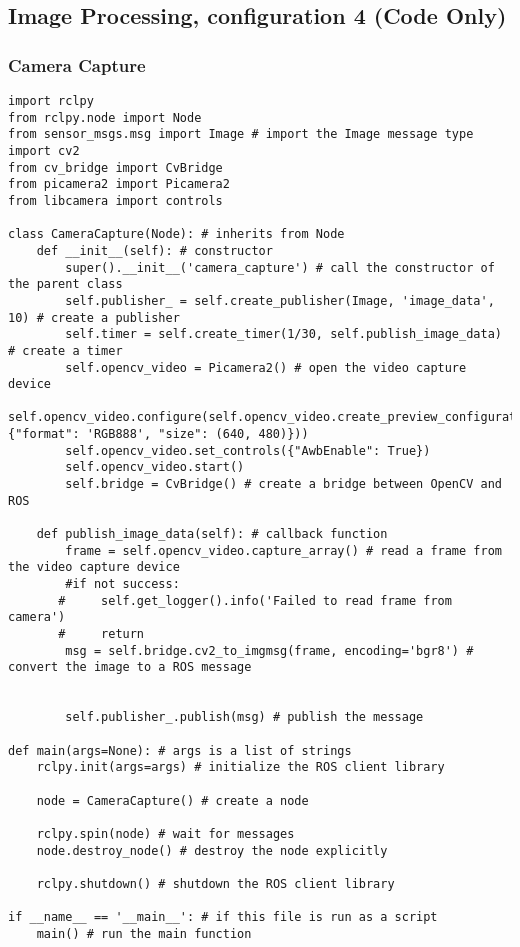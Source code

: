 \subsection{Image Processing, configuration 4 (Code Only)}

\subsubsection{Camera Capture}
\begin{lstlisting}[language=PythonPlus, basicstyle=\tiny,]
import rclpy
from rclpy.node import Node
from sensor_msgs.msg import Image # import the Image message type
import cv2
from cv_bridge import CvBridge
from picamera2 import Picamera2
from libcamera import controls

class CameraCapture(Node): # inherits from Node
    def __init__(self): # constructor
        super().__init__('camera_capture') # call the constructor of the parent class
        self.publisher_ = self.create_publisher(Image, 'image_data', 10) # create a publisher
        self.timer = self.create_timer(1/30, self.publish_image_data) # create a timer
        self.opencv_video = Picamera2() # open the video capture device
        self.opencv_video.configure(self.opencv_video.create_preview_configuration(main={"format": 'RGB888', "size": (640, 480)}))
        self.opencv_video.set_controls({"AwbEnable": True})
        self.opencv_video.start() 
        self.bridge = CvBridge() # create a bridge between OpenCV and ROS

    def publish_image_data(self): # callback function
        frame = self.opencv_video.capture_array() # read a frame from the video capture device
        #if not success:
       #     self.get_logger().info('Failed to read frame from camera')
       #     return
        msg = self.bridge.cv2_to_imgmsg(frame, encoding='bgr8') # convert the image to a ROS message
        

        self.publisher_.publish(msg) # publish the message

def main(args=None): # args is a list of strings
    rclpy.init(args=args) # initialize the ROS client library

    node = CameraCapture() # create a node

    rclpy.spin(node) # wait for messages
    node.destroy_node() # destroy the node explicitly

    rclpy.shutdown() # shutdown the ROS client library

if __name__ == '__main__': # if this file is run as a script
    main() # run the main function

\end{lstlisting}

